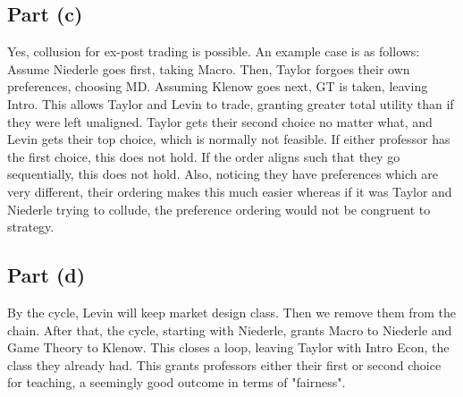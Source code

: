 \documentclass[10pt,a4paper]{article}
\begin{document}
  \subsection*{Part (c)}
    Yes, collusion for ex-post trading is possible. An example case is as follows: Assume Niederle goes first, taking Macro. Then, Taylor forgoes their own preferences, choosing MD. Assuming Klenow goes next, GT is taken, leaving Intro. This allows Taylor and Levin to trade, granting greater total utility than if they were left unaligned. Taylor gets their second choice no matter what, and Levin gets their top choice, which is normally not feasible. If either professor has the first choice, this does not hold. If the order aligns such that they go sequentially, this does not hold. Also, noticing they have preferences which are very different, their ordering makes this much easier whereas if it was Taylor and Niederle trying to collude, the preference ordering would not be congruent to strategy.
    
  \subsection*{Part (d)}
    By the cycle, Levin will keep market design class. Then we remove them from the chain. After that, the cycle, starting with Niederle, grants Macro to Niederle and Game Theory to Klenow. This closes a loop, leaving Taylor with Intro Econ, the class they already had. This grants professors either their first or second choice for teaching, a seemingly good outcome in terms of "fairness".
\end{document}
